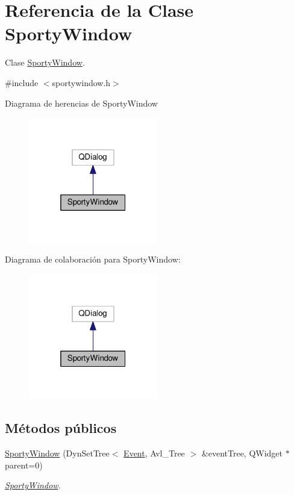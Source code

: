 \hypertarget{class_sporty_window}{}\section{Referencia de la Clase Sporty\+Window}
\label{class_sporty_window}


Clase \hyperlink{class_sporty_window}{Sporty\+Window}.  




{\ttfamily \#include $<$sportywindow.\+h$>$}



Diagrama de herencias de Sporty\+Window\nopagebreak
\begin{figure}[H]
\begin{center}
\leavevmode
\includegraphics[width=160pt]{class_sporty_window__inherit__graph}
\end{center}
\end{figure}


Diagrama de colaboración para Sporty\+Window\+:\nopagebreak
\begin{figure}[H]
\begin{center}
\leavevmode
\includegraphics[width=160pt]{class_sporty_window__coll__graph}
\end{center}
\end{figure}
\subsection*{Métodos públicos}
\begin{DoxyCompactItemize}
\item 
\hyperlink{class_sporty_window_aa6648488a2edf18678b39156fbf43d63}{Sporty\+Window} (Dyn\+Set\+Tree$<$ \hyperlink{class_event}{Event}, Avl\+\_\+\+Tree $>$ \&event\+Tree, Q\+Widget $\ast$parent=0)
\begin{DoxyCompactList}\small\item\em \hyperlink{class_sporty_window}{Sporty\+Window}. \end{DoxyCompactList}\end{DoxyCompactItemize}
